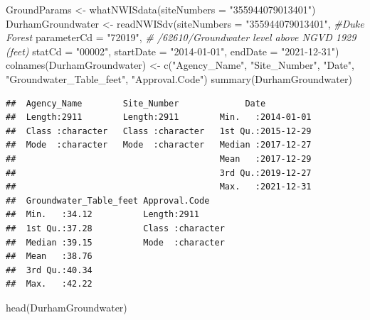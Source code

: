 \documentclass[
  12pt,
]{article}
\newenvironment{Shaded}{\begin{snugshade}}{\end{snugshade}}
\newcommand{\AttributeTok}[1]{\textcolor[rgb]{0.77,0.63,0.00}{#1}}
\newcommand{\CommentTok}[1]{\textcolor[rgb]{0.56,0.35,0.01}{\textit{#1}}}
\newcommand{\FunctionTok}[1]{\textcolor[rgb]{0.00,0.00,0.00}{#1}}
\newcommand{\NormalTok}[1]{#1}
\newcommand{\OtherTok}[1]{\textcolor[rgb]{0.56,0.35,0.01}{#1}}
\newcommand{\StringTok}[1]{\textcolor[rgb]{0.31,0.60,0.02}{#1}}
\begin{document}
\begin{Shaded}
\begin{Highlighting}[]
\NormalTok{GroundParams }\OtherTok{\textless{}{-}} \FunctionTok{whatNWISdata}\NormalTok{(}\AttributeTok{siteNumbers =} \StringTok{"355944079013401"}\NormalTok{)}
\NormalTok{DurhamGroundwater }\OtherTok{\textless{}{-}} \FunctionTok{readNWISdv}\NormalTok{(}\AttributeTok{siteNumbers =} \StringTok{"355944079013401"}\NormalTok{, }\CommentTok{\#Duke Forest}
                                 \AttributeTok{parameterCd =} \StringTok{"72019"}\NormalTok{, }
                                \CommentTok{\# /62610/Groundwater level above NGVD 1929 (feet)}
                                 \AttributeTok{statCd =} \StringTok{"00002"}\NormalTok{,}
                                 \AttributeTok{startDate =} \StringTok{"2014{-}01{-}01"}\NormalTok{,}
                                 \AttributeTok{endDate =} \StringTok{"2021{-}12{-}31"}\NormalTok{)}
\FunctionTok{colnames}\NormalTok{(DurhamGroundwater) }\OtherTok{\textless{}{-}} \FunctionTok{c}\NormalTok{(}\StringTok{"Agency\_Name"}\NormalTok{,}
                                 \StringTok{"Site\_Number"}\NormalTok{,}
                                 \StringTok{"Date"}\NormalTok{,}
                                 \StringTok{"Groundwater\_Table\_feet"}\NormalTok{, }
                                 \StringTok{"Approval.Code"}\NormalTok{)}
\FunctionTok{summary}\NormalTok{(DurhamGroundwater)}
\end{Highlighting}
\end{Shaded}

\begin{verbatim}
##  Agency_Name        Site_Number             Date           
##  Length:2911        Length:2911        Min.   :2014-01-01  
##  Class :character   Class :character   1st Qu.:2015-12-29  
##  Mode  :character   Mode  :character   Median :2017-12-27  
##                                        Mean   :2017-12-29  
##                                        3rd Qu.:2019-12-27  
##                                        Max.   :2021-12-31  
##  Groundwater_Table_feet Approval.Code     
##  Min.   :34.12          Length:2911       
##  1st Qu.:37.28          Class :character  
##  Median :39.15          Mode  :character  
##  Mean   :38.76                            
##  3rd Qu.:40.34                            
##  Max.   :42.22
\end{verbatim}

\begin{Shaded}
\begin{Highlighting}[]
\FunctionTok{head}\NormalTok{(DurhamGroundwater)}
\end{Highlighting}
\end{Shaded}
\end{document}
